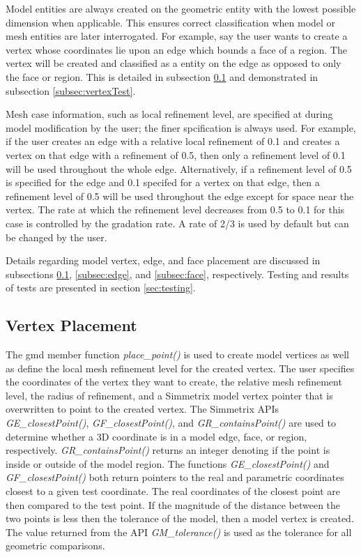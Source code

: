 \documentclass[a4paper, 12pt]{article}
\begin{document}
Model entities are always created on the geometric entity with the
lowest possible dimension when applicable. This ensures correct classification when model
or mesh entities are later interrogated. For example, say the
user wants to create a vertex whose coordinates lie upon an edge
which bounds a face of a region. The vertex will be created and 
classified as a entity on the edge as opposed to only the face or region. 
This is detailed in subsection \ref{subsec:vertex} and  demonstrated 
in subsection \ref{subsec:vertexTest}.

Mesh case information, such as local refinement level, are
specified at during model modification by the user; the finer
spcification is always used. For example, if the user 
creates an edge with a relative local refinement of 0.1
and creates a vertex on that edge with a refinement of 0.5, 
then only a refinement level of 0.1 will be used throughout 
the whole edge. Alternatively, if a refinement level of 0.5 
is specified for the edge and 0.1 specifed for a vertex on that
edge, then a refinement level of 0.5 will be used throughout the 
edge except for space near the vertex. The rate at which the 
refinement level decreases from 0.5 to 0.1 for this case is controlled
by the gradation rate. A rate of 2/3 is used by default 
but can be changed by the user. 

Details regarding model vertex, edge, and face placement are 
discussed in subsections \ref{subsec:vertex}, \ref{subsec:edge}, 
and \ref{subsec:face}, respectively. Testing and results of tests
are presented in section \ref{sec:testing}.

\subsection{Vertex Placement} \label{subsec:vertex}
The gmd member function \emph{place\_point()} is used to create model
vertices as well as define the local mesh refinement level for the created vertex.
The user specifies the coordinates of the vertex they want to create, the 
relative mesh refinement level, the radius of refinement, and a Simmetrix
model vertex pointer that is overwritten to point to the created vertex. 
The Simmetrix APIs \emph{GE\_closestPoint()}, \emph{GF\_closestPoint()}, 
and \emph{GR\_containsPoint()} are used to determine whether a 3D coordinate 
is in a model edge, face, or region, respectively. \emph{GR\_containsPoint()}
returns an integer denoting if the point is inside or outside of the model region. 
The functions \emph{GE\_closestPoint()} and \emph{GF\_closestPoint()} both return 
pointers to the real and parametric coordinates closest to a given test coordinate. 
The real coordinates of the closest point are then compared to the test point.
If the magnitude of the distance between the two points is less then the 
tolerance of the model, then a model vertex is created. 
The value returned from the API \emph{GM\_tolerance()} is used as the 
tolerance for all geometric comparisons.
\end{document}
